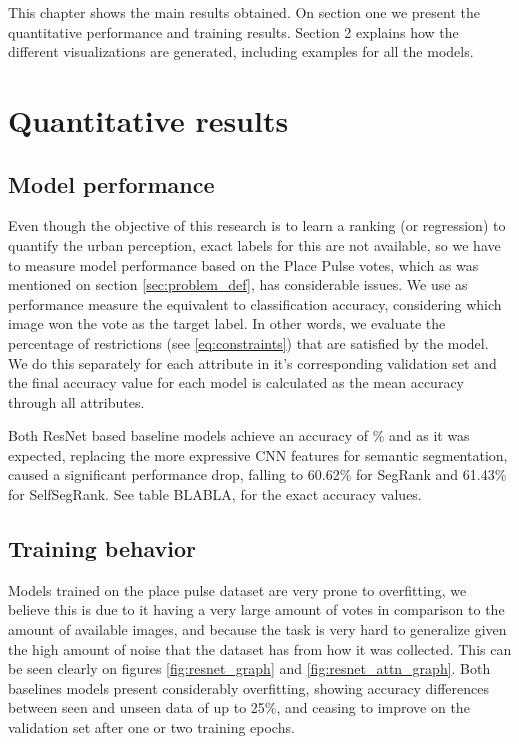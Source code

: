 This chapter shows the main results obtained. On section one we present the quantitative
performance and training results. Section 2 explains how the different visualizations
are generated, including examples for all the models.

\section{Quantitative results}

\subsection{Model performance}

Even though the objective of this research is to learn a ranking (or regression) to
quantify the urban perception, exact labels for this are not available, so we have to measure
model performance based on the Place Pulse votes, which as was mentioned on section
\ref{sec:problem_def}, has considerable issues. We use as performance measure the
equivalent to classification accuracy, considering which image won the vote as the target label.
In other words, we evaluate the percentage of restrictions (see \ref{eq:constraints})
that are satisfied by the model. We do this separately for each attribute in it's corresponding
validation set and the final accuracy value for each model is calculated as the mean accuracy through
all attributes.

Both ResNet based baseline models achieve an accuracy of \% and
as it was expected, replacing the more expressive CNN features for semantic segmentation,
caused a significant performance drop, falling to 60.62\% for SegRank and 61.43\% %
for SelfSegRank. %
See table BLABLA, for the exact accuracy values.

\subsection{Training behavior}

Models trained on the place pulse dataset are very prone to overfitting, we believe this is due to it
having a very large amount of votes in comparison to the amount of available images, and because the task
is very hard to generalize given the high amount of noise that the dataset has from how it was collected.
This can be seen clearly on figures \ref{fig:resnet_graph} and \ref{fig:resnet_attn_graph}. Both
baselines models present considerably overfitting, showing accuracy differences between seen and unseen data
of up to 25\%, and ceasing to improve on the validation set after one or two training epochs.

